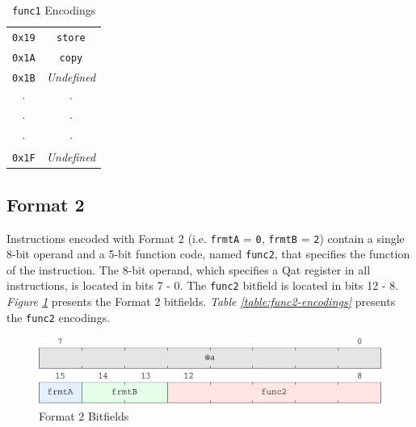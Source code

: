 \documentclass[sigconf, nonacm=true, screen=true]{acmart}
\begin{document}
\begin{center}
\begin{table}[h]
\begin{tabular}[t]{cc}
            \texttt{0x19} & \texttt{store} \\
            \texttt{0x1A} & \texttt{copy} \\
            \texttt{0x1B} & \textit{Undefined} \\
            \(\cdot\) & \(\cdot\) \\
            \(\cdot\) & \(\cdot\) \\
            \(\cdot\) & \(\cdot\) \\
            \texttt{0x1F} & \textit{Undefined} \\
            \bottomrule
        \end{tabular}
        \caption{\texttt{func1} Encodings}
        \label{table:func1-encodings}
    \end{table}
\end{center}


\subsection{Format 2}
Instructions encoded with Format 2 (i.e. \texttt{frmtA} = \texttt{0}, \texttt{frmtB} = \texttt{2}) contain a single 8-bit operand and a 5-bit function code, named \texttt{func2}, that specifies the function of the instruction. The 8-bit operand, which specifies a Qat register in all instructions, is located in bits 7 - 0. The \texttt{func2} bitfield is located in bits 12 - 8. \textit{Figure \ref{figure:format2-bitfields}} presents the Format 2 bitfields. \textit{Table \ref{table:func2-encodings}} presents the \texttt{func2} encodings. 

\begin{figure}[h]
    \includegraphics[width=\columnwidth]{bitfields/format2_2-lane.pdf}
    \caption{Format 2 Bitfields}
    \label{figure:format2-bitfields}
\end{figure}
\end{document}
